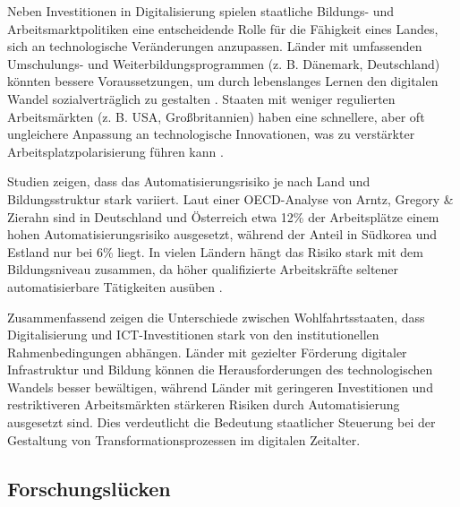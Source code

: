Neben Investitionen in Digitalisierung spielen staatliche Bildungs- und 
Arbeitsmarktpolitiken eine entscheidende Rolle für die Fähigkeit eines Landes, sich an 
technologische Veränderungen anzupassen. Länder mit umfassenden Umschulungs- und 
Weiterbildungsprogrammen (z. B. Dänemark, Deutschland) könnten bessere Voraussetzungen, um 
durch lebenslanges Lernen den digitalen Wandel sozialverträglich zu gestalten 
\parencite[vgl.][S. 370-371]{vu2011ict}. Staaten mit weniger regulierten Arbeitsmärkten 
(z. B. USA, Großbritannien) haben eine schnellere, aber oft ungleichere Anpassung an 
technologische Innovationen, was zu verstärkter Arbeitsplatzpolarisierung führen kann 
\parencite[vgl.][S. 27-28]{hall2001varieties}.

Studien zeigen, dass das Automatisierungsrisiko je nach Land und Bildungsstruktur stark 
variiert. Laut einer OECD-Analyse von Arntz, Gregory \& Zierahn sind in Deutschland und 
Österreich etwa 12\% der Arbeitsplätze einem hohen Automatisierungsrisiko ausgesetzt, 
während der Anteil in Südkorea und Estland nur bei 6\% liegt. In vielen Ländern hängt 
das Risiko stark mit dem Bildungsniveau zusammen, da höher qualifizierte Arbeitskräfte 
seltener automatisierbare Tätigkeiten ausüben \parencite[vgl.][S. 15-16]{arntz2016therisk}. 


Zusammenfassend zeigen die Unterschiede zwischen Wohlfahrtsstaaten, dass Digitalisierung 
und \ac{ICT}-Investitionen stark von den institutionellen Rahmenbedingungen abhängen. 
Länder mit gezielter Förderung digitaler Infrastruktur und Bildung können die 
Herausforderungen des technologischen Wandels besser bewältigen, während Länder mit 
geringeren Investitionen und restriktiveren Arbeitsmärkten stärkeren Risiken durch 
Automatisierung ausgesetzt sind. Dies verdeutlicht die Bedeutung staatlicher Steuerung 
bei der Gestaltung von Transformationsprozessen im digitalen Zeitalter.


\subsection{Forschungslücken}

